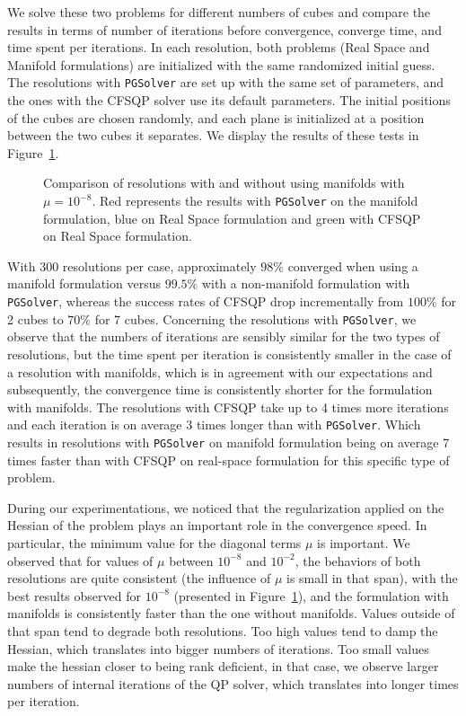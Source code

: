 We solve these two problems for different numbers of cubes and compare the results in terms of number of iterations before convergence, converge time, and time spent per iterations.
In each resolution, both problems (Real Space and Manifold formulations) are initialized with the same randomized initial guess.
The resolutions with {\tt PGSolver} are set up with the same set of parameters, and the ones with the CFSQP solver use its default parameters.
The initial positions of the cubes are chosen randomly, and each plane is initialized at a position between the two cubes it separates.
We display the results of these tests in Figure~\ref{fig:timings-cubes}.
\begin{figure}[htpb]
  \centering
  
  \caption{Comparison of resolutions with and without using manifolds with $\mu=10^{-8}$. Red represents the results with {\tt PGSolver} on the manifold formulation, blue on Real Space formulation and green with CFSQP on Real Space formulation.}
\label{fig:timings-cubes}
\end{figure}

With 300 resolutions per case, approximately $98\%$ converged when using a manifold formulation versus $99.5\%$ with a non-manifold formulation with {\tt PGSolver}, whereas the success rates of CFSQP drop incrementally from $100\%$ for 2 cubes to $70\%$ for 7 cubes.
Concerning the resolutions with {\tt PGSolver}, we observe that the numbers of iterations are sensibly similar for the two types of resolutions, but the time spent per iteration is consistently smaller in the case of a resolution with manifolds, which is in agreement with our expectations and subsequently, the convergence time is consistently shorter for the formulation with manifolds.
The resolutions with CFSQP take up to 4 times more iterations and each iteration is on average 3 times longer than with {\tt PGSolver}.
Which results in resolutions with {\tt PGSolver} on manifold formulation being on average 7 times faster than with CFSQP on real-space formulation for this specific type of problem.

During our experimentations, we noticed that the regularization applied on the Hessian of the problem plays an important role in the convergence speed.
In particular, the minimum value for the diagonal terms $\mu$ is important.
We observed that for values of $\mu$ between $10^{-8}$ and $10^{-2}$, the behaviors of both resolutions are quite consistent (the influence of $\mu$ is small in that span), with the best results observed for $10^{-8}$ (presented in Figure~\ref{fig:timings-cubes}), and the formulation with manifolds is consistently faster than the one without manifolds.
Values outside of that span tend to degrade both resolutions.
Too high values tend to damp the Hessian, which translates into bigger numbers of iterations.
Too small values make the hessian closer to being rank deficient, in that case, we observe larger numbers of internal iterations of the QP solver, which translates into longer times per iteration.

